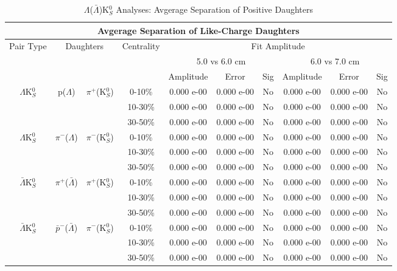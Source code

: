 \documentclass[../AnalysisNoteJBuxton.tex]{subfiles}
\begin{document}
\begin{table}
 \centering
 \begin{tabular}{|c|c|c|c|c|c|c||c|c|c|}
 \multicolumn{10}{c}{Avgerage Separation of Like-Charge Daughters} \\
  \hline
  \multirow{3}{*}{Pair Type} & \multicolumn{2}{c|}{\multirow{3}{*}{Daughters}} & \multirow{3}{*}{Centrality} & \multicolumn{6}{c|}{Fit Amplitude} \\
  \cline{5-10}
   & \multicolumn{2}{c|}{} & & \multicolumn{3}{c||}{5.0 vs 6.0 cm} & \multicolumn{3}{c|}{6.0 vs 7.0 cm} \\
  \cline{5-10}
   & \multicolumn{2}{c|}{} & & Amplitude & Error & Sig & Amplitude & Error & Sig \\
  \hline
  \multirow{3}{*}{$\Lambda$K$^{0}_{S}$} & \multirow{3}{*}{p($\Lambda$)} & \multirow{3}{*}{$\pi^{+}$(K$^{0}_{S}$)}
   &      0-10\% & 0.000 e-00 & 0.000 e-00 & No & 0.000 e-00 & 0.000 e-00 & No \\
   & & & 10-30\% & 0.000 e-00 & 0.000 e-00 & No & 0.000 e-00 & 0.000 e-00 & No \\
   & & & 30-50\% & 0.000 e-00 & 0.000 e-00 & No & 0.000 e-00 & 0.000 e-00 & No \\
  \hline
  \multirow{3}{*}{$\Lambda$K$^{0}_{S}$} & \multirow{3}{*}{$\pi^{-}$($\Lambda$)} & \multirow{3}{*}{$\pi^{-}$(K$^{0}_{S}$) }
   &      0-10\% & 0.000 e-00 & 0.000 e-00 & No & 0.000 e-00 & 0.000 e-00 & No \\
   & & & 10-30\% & 0.000 e-00 & 0.000 e-00 & No & 0.000 e-00 & 0.000 e-00 & No \\
   & & & 30-50\% & 0.000 e-00 & 0.000 e-00 & No & 0.000 e-00 & 0.000 e-00 & No \\
  \hline \hline
  \multirow{3}{*}{$\bar{\Lambda}$K$^{0}_{S}$} & \multirow{3}{*}{$\pi^{+}$($\bar{\Lambda}$)} & \multirow{3}{*}{$\pi^{+}$(K$^{0}_{S}$)} 
   &      0-10\% & 0.000 e-00 & 0.000 e-00 & No & 0.000 e-00 & 0.000 e-00 & No \\ 
   & & & 10-30\% & 0.000 e-00 & 0.000 e-00 & No & 0.000 e-00 & 0.000 e-00 & No \\
   & & & 30-50\% & 0.000 e-00 & 0.000 e-00 & No & 0.000 e-00 & 0.000 e-00 & No \\
  \hline
  \multirow{3}{*}{$\bar{\Lambda}$K$^{0}_{S}$} & \multirow{3}{*}{$\bar{p}^{-}$($\bar{\Lambda}$)} & \multirow{3}{*}{$\pi^{-}$(K$^{0}_{S}$)}
   &      0-10\% & 0.000 e-00 & 0.000 e-00 & No & 0.000 e-00 & 0.000 e-00 & No \\
   & & & 10-30\% & 0.000 e-00 & 0.000 e-00 & No & 0.000 e-00 & 0.000 e-00 & No \\
   & & & 30-50\% & 0.000 e-00 & 0.000 e-00 & No & 0.000 e-00 & 0.000 e-00 & No \\
  \hline
 \end{tabular}
 \caption{$\Lambda$($\bar{\Lambda}$)K$^{0}_{S}$ Analyses: Avgerage Separation of Positive Daughters}
 \label{tab:AvgSepLamK0}
\end{table}
\end{document}
